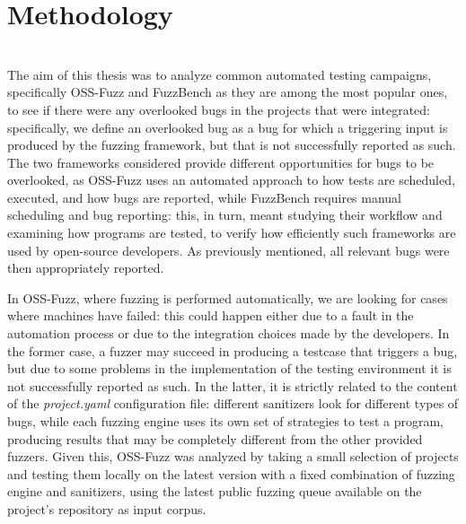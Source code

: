 \chapter{Methodology} \label{chap_3}
\ \\

The aim of this thesis was to analyze common automated testing campaigns, specifically OSS-Fuzz and FuzzBench as they are among the most popular ones, to see if there were any overlooked bugs in the projects that were integrated: specifically, we define an overlooked bug as a bug for which a triggering input is produced by the fuzzing framework, but that is not successfully reported as such. The two frameworks considered provide different opportunities for bugs to be overlooked, as OSS-Fuzz uses an automated approach to how tests are scheduled, executed, and how bugs are reported, while FuzzBench requires manual scheduling and bug reporting: this, in turn, meant studying their workflow and examining how programs are tested, to verify how efficiently such frameworks are used by open-source developers.
As previously mentioned, all relevant bugs were then appropriately reported.

In OSS-Fuzz, where fuzzing is performed automatically, we are looking for cases where machines have failed: this could happen either due to a fault in the automation process or due to the integration choices made by the developers. In the former case, a fuzzer may succeed in producing a testcase that triggers a bug, but due to some problems in the implementation of the testing environment it is not successfully reported as such. In the latter, it is strictly related to the content of the \textit{project.yaml} configuration file: different sanitizers look for different types of bugs, while each fuzzing engine uses its own set of strategies to test a program, producing results that may be completely different from the other provided fuzzers. Given this, OSS-Fuzz was analyzed by taking a small selection of projects and testing them locally on the latest version with a fixed combination of fuzzing engine and sanitizers, using the latest public fuzzing queue available on the project's repository as input corpus. 

